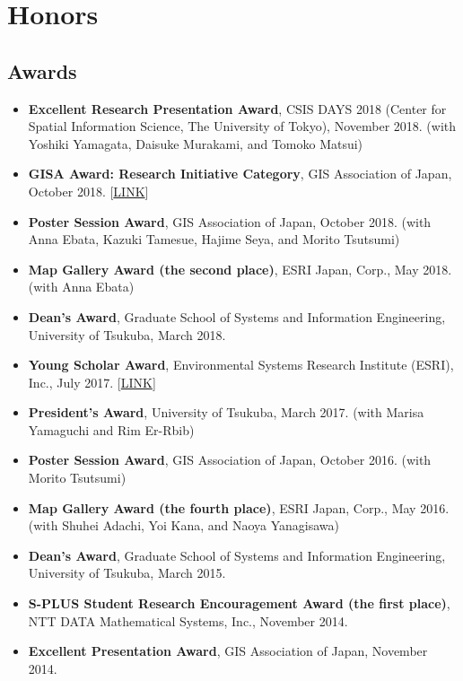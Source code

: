 \documentclass[]{book}
\providecommand{\tightlist}{%
  \setlength{\itemsep}{0pt}\setlength{\parskip}{0pt}}
\begin{document}
\hypertarget{honors}{%
\chapter*{Honors}\label{honors}}

\hypertarget{awards}{%
\section*{Awards}\label{awards}}

\begin{itemize}
\tightlist
\item
  \textbf{Excellent Research Presentation Award}, CSIS DAYS 2018 (Center for Spatial Information Science, The University of Tokyo), November 2018.
  (with Yoshiki Yamagata, Daisuke Murakami, and Tomoko Matsui)
\item
  \textbf{GISA Award: Research Initiative Category}, GIS Association of Japan, October 2018. {[}\href{http://www.gisa-japan.org/file/nl108.pdf}{LINK}{]}
\item
  \textbf{Poster Session Award}, GIS Association of Japan, October 2018.
  (with Anna Ebata, Kazuki Tamesue, Hajime Seya, and Morito Tsutsumi)
\item
  \textbf{Map Gallery Award (the second place)}, ESRI Japan, Corp., May 2018.
  (with Anna Ebata)
\item
  \textbf{Dean's Award}, Graduate School of Systems and Information Engineering, University of Tsukuba, March 2018.
\item
  \textbf{Young Scholar Award}, Environmental Systems Research Institute (ESRI), Inc., July 2017. {[}\href{https://www.esrij.com/cgi-bin/wp/wp-content/uploads/2017/01/YSA-Taiken2017.pdf}{LINK}{]}
\item
  \textbf{President's Award}, University of Tsukuba, March 2017.
  (with Marisa Yamaguchi and Rim Er-Rbib)
\item
  \textbf{Poster Session Award}, GIS Association of Japan, October 2016.
  (with Morito Tsutsumi)
\item
  \textbf{Map Gallery Award (the fourth place)}, ESRI Japan, Corp., May 2016.
  (with Shuhei Adachi, Yoi Kana, and Naoya Yanagisawa)
\item
  \textbf{Dean's Award}, Graduate School of Systems and Information Engineering, University of Tsukuba, March 2015.
\item
  \textbf{S-PLUS Student Research Encouragement Award (the first place)}, NTT DATA Mathematical Systems, Inc., November 2014.
\item
  \textbf{Excellent Presentation Award}, GIS Association of Japan, November 2014.
\end{itemize}
\end{document}
